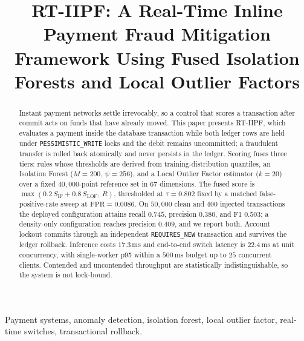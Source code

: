 \documentclass[conference]{IEEEtran}
\begin{document}
\title{RT-IIPF: A Real-Time Inline Payment Fraud Mitigation
Framework Using Fused Isolation Forests and Local Outlier Factors}

\author{
}

\maketitle

\begin{abstract}
Instant payment networks settle irrevocably, so a control that scores a
transaction after commit acts on funds that have already moved. This
paper presents RT-IIPF, which evaluates a payment inside the database
transaction while both ledger rows are held under
\texttt{PESSIMISTIC\_WRITE} locks and the debit remains uncommitted; a
fraudulent transfer is rolled back atomically and never persists in the
ledger. Scoring fuses three tiers: rules whose thresholds are derived
from training-distribution quantiles, an Isolation Forest ($M=200$,
$\psi=256$), and a Local Outlier Factor estimator ($k=20$) over a fixed
$40{,}000$-point reference set in $67$ dimensions. The fused score is
$\max(0.2\,S_{\mathrm{IF}} + 0.8\,S_{\mathrm{LOF}},\,R)$, thresholded at
$\tau = 0.802$ fixed by a matched false-positive-rate sweep at
$\mathrm{FPR}=0.0086$. On $50{,}000$ clean and $400$ injected
transactions the deployed configuration attains recall $0.745$,
precision $0.380$, and F1 $0.503$; a density-only configuration reaches
precision $0.409$, and we report both. Account lockout commits through
an independent \texttt{REQUIRES\_NEW} transaction and survives the
ledger rollback. Inference costs $17.3$\,ms and end-to-end switch
latency is $22.4$\,ms at unit concurrency, with single-worker p95
within a $500$\,ms budget up to $25$ concurrent clients. Contended and
uncontended throughput are statistically indistinguishable, so the
system is not lock-bound.
\end{abstract}

\begin{IEEEkeywords}
Payment systems, anomaly detection, isolation forest, local outlier
factor, real-time switches, transactional rollback.
\end{IEEEkeywords}

\end{document}
